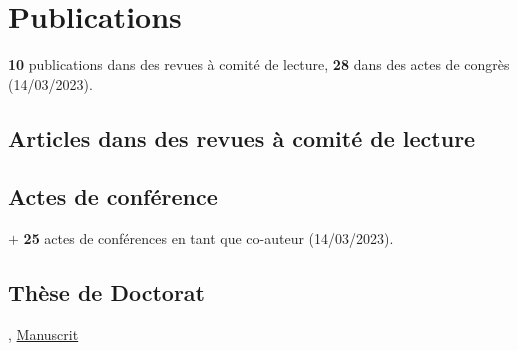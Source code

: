 \section{Publications}
\textbf{10} publications dans des revues à comité de lecture, \textbf{28} dans des actes de congrès (14/03/2023).

\subsection{Articles dans des revues à comité de lecture}

\tabitem {}

\tabitem {}

\tabitem {}

\tabitem {}

\tabitem {}

\tabitem {}

\tabitem {}

\tabitem {}

\tabitem {}

\tabitem {}

\subsection{Actes de conférence}
\tabitem {}

\tabitem {}

\tabitem {}

$+$ \textbf{25} actes de conférences en tant que co-auteur (14/03/2023).

\subsection{Thèse de Doctorat}
, \href{https://raw.githubusercontent.com/fkeruzore/PhDThesis-public/main/manuscrit.pdf}{Manuscrit}
